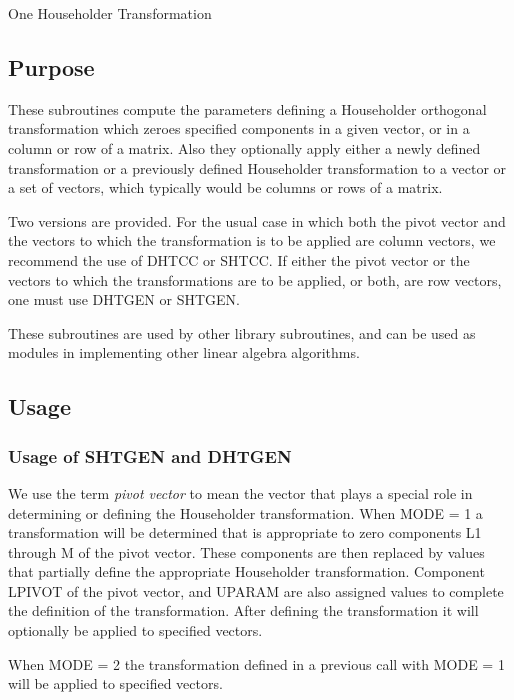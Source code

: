\documentclass[twoside]{MATH77}
\begin{document}
  One Householder Transformation


\subsection{Purpose}

These subroutines compute the parameters defining a Householder orthogonal
transformation which zeroes specified components in a given vector, or in
a column or row of a matrix. Also they optionally apply either a newly
defined transformation or a previously defined Householder transformation to
a vector or a set of vectors, which typically would be columns or rows of a
matrix.

Two versions are provided. For the usual case in which both the pivot vector
and the vectors to which the transformation is to be applied are column
vectors, we recommend the use of DHTCC or SHTCC. If either the pivot vector
or the vectors to which the transformations are to be applied, or both, are
row vectors, one must use DHTGEN or SHTGEN.

These subroutines are used by other library subroutines, and can be used as
modules in implementing other linear algebra algorithms.

\subsection{Usage}

\subsubsection{Usage of SHTGEN and DHTGEN}

We use the term {\em pivot vector} to mean the vector that plays a special role in
determining or defining the Householder transformation. When MODE = 1 a
transformation will be determined that is appropriate to zero components L1
through M of the pivot vector. These components are then replaced by
values that partially define the appropriate Householder transformation.
Component LPIVOT of the pivot vector, and UPARAM are also assigned values to
complete the definition of the transformation. After defining the
transformation it will optionally be applied to specified vectors.

When MODE = 2 the transformation defined in a previous call with MODE
= 1 will be applied to specified vectors.
\end{document}
